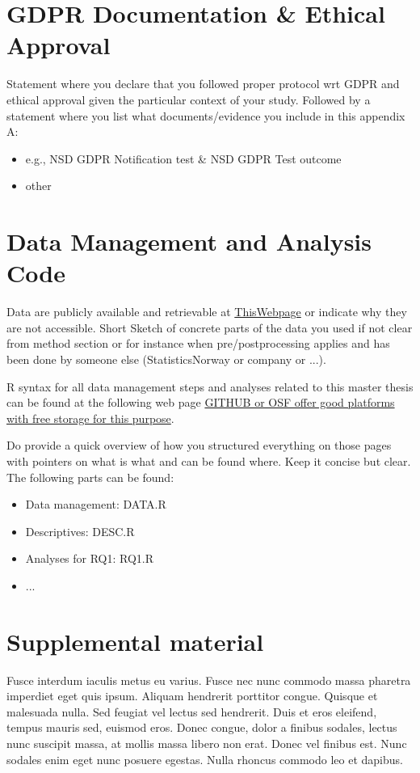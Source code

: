 \documentclass[a4paper,12pt,stu,donotrepeattitle,floatsintext,twoside]{apa7}
\newcommand{\appindent}{\phantom{1}\par\vspace{-0.5\baselineskip}} %
\begin{document}
\appendix

\section{GDPR Documentation \& Ethical Approval}\label{app:A}

\appindent Statement where you declare that you followed proper protocol wrt GDPR and ethical approval given the particular context of your study. Followed by a statement where you list what documents/evidence you include in this appendix A:
\begin{itemize}
    \item e.g., NSD GDPR Notification test \& NSD GDPR Test outcome
    \item other
\end{itemize}




\section{Data Management and Analysis Code}\label{app:B}

\appindent Data are publicly available and retrievable at \url{ThisWebpage} or indicate why they are not accessible. Short Sketch of concrete parts of the data you used if not clear from method section or for instance when pre/postprocessing applies and has been done by someone else (StatisticsNorway or company or ...).


R syntax for all data management steps and analyses related to this master thesis can be found at the following web page \url{GITHUB or OSF offer good platforms with free storage for this purpose}.

Do provide a quick overview of how you structured everything on those pages with pointers on what is what and can be found where. Keep it concise but  clear. The following parts can be found:
\begin{itemize}
    \item Data management: DATA.R
    \item Descriptives: DESC.R
    \item Analyses for RQ1: RQ1.R
    \item ...
\end{itemize}

\section{Supplemental material}\label{app:C}

\appindent Fusce interdum iaculis metus eu varius. Fusce nec nunc commodo massa pharetra imperdiet eget quis ipsum. Aliquam hendrerit porttitor congue. Quisque et malesuada nulla. Sed feugiat vel lectus sed hendrerit. Duis et eros eleifend, tempus mauris sed, euismod eros. Donec congue, dolor a finibus sodales, lectus nunc suscipit massa, at mollis massa libero non erat. Donec vel finibus est. Nunc sodales enim eget nunc posuere egestas. Nulla rhoncus commodo leo et dapibus.
\end{document}
